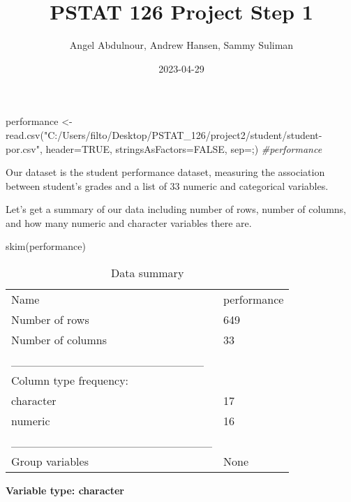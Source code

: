 \documentclass[
]{article}
\title{PSTAT 126 Project Step 1}
\author{Angel Abdulnour, Andrew Hansen, Sammy Suliman}
\date{2023-04-29}
\newenvironment{Shaded}{\begin{snugshade}}{\end{snugshade}}
\newcommand{\AttributeTok}[1]{\textcolor[rgb]{0.77,0.63,0.00}{#1}}
\newcommand{\CommentTok}[1]{\textcolor[rgb]{0.56,0.35,0.01}{\textit{#1}}}
\newcommand{\ConstantTok}[1]{\textcolor[rgb]{0.00,0.00,0.00}{#1}}
\newcommand{\FunctionTok}[1]{\textcolor[rgb]{0.00,0.00,0.00}{#1}}
\newcommand{\NormalTok}[1]{#1}
\newcommand{\OtherTok}[1]{\textcolor[rgb]{0.56,0.35,0.01}{#1}}
\newcommand{\StringTok}[1]{\textcolor[rgb]{0.31,0.60,0.02}{#1}}
\begin{document}
\maketitle

\begin{Shaded}
\begin{Highlighting}[]
\NormalTok{performance }\OtherTok{\textless{}{-}} \FunctionTok{read.csv}\NormalTok{(}\StringTok{"C:/Users/filto/Desktop/PSTAT\_126/project2/student/student{-}por.csv"}\NormalTok{, }\AttributeTok{header=}\ConstantTok{TRUE}\NormalTok{, }\AttributeTok{stringsAsFactors=}\ConstantTok{FALSE}\NormalTok{, }\AttributeTok{sep=}\StringTok{\textquotesingle{};\textquotesingle{}}\NormalTok{)}
\CommentTok{\#performance}
\end{Highlighting}
\end{Shaded}

Our dataset is the student performance dataset, measuring the
association between student's grades and a list of 33 numeric and
categorical variables.

Let's get a summary of our data including number of rows, number of
columns, and how many numeric and character variables there are.

\begin{Shaded}
\begin{Highlighting}[]
\FunctionTok{skim}\NormalTok{(performance)}
\end{Highlighting}
\end{Shaded}

\begin{longtable}[]{@{}ll@{}}
\caption{Data summary}\tabularnewline
\toprule()
\endhead
Name & performance \\
Number of rows & 649 \\
Number of columns & 33 \\
\_\_\_\_\_\_\_\_\_\_\_\_\_\_\_\_\_\_\_\_\_\_\_ & \\
Column type frequency: & \\
character & 17 \\
numeric & 16 \\
\_\_\_\_\_\_\_\_\_\_\_\_\_\_\_\_\_\_\_\_\_\_\_\_ & \\
Group variables & None \\
\bottomrule()
\end{longtable}

\textbf{Variable type: character}
\end{document}
